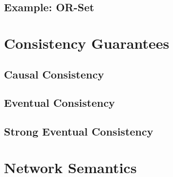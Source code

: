 \subsection{Example: OR-Set}
\section{Consistency Guarantees}
\subsection{Causal Consistency}
\subsection{Eventual Consistency}
\subsection{Strong Eventual Consistency}
\section{Network Semantics}
